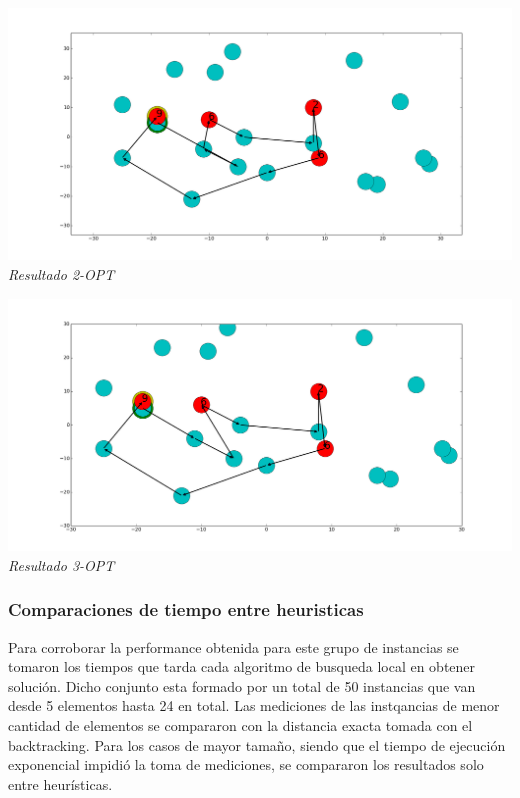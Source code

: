   \vspace*{0.3cm} \vspace*{0.3cm}
  \begin{center}
\includegraphics[scale=0.3]{./EJ5/caminoEj2opt.png}
\\{\textit{Resultado 2-OPT}}
  \end{center}
  \vspace*{0.3cm}
  
    \vspace*{0.3cm} \vspace*{0.3cm}
  \begin{center}
\includegraphics[scale=0.3]{./EJ5/caminoEj3opt.png}
\\{\textit{Resultado 3-OPT}}
  \end{center}
  \vspace*{0.3cm}

\subsubsection{Comparaciones de tiempo entre heuristicas}

Para corroborar la performance obtenida para este grupo de instancias se tomaron los tiempos que tarda cada algoritmo de busqueda local en obtener soluci\'on. 
Dicho conjunto esta formado por un total de 50 instancias que van desde 5 elementos hasta 24 en total. Las mediciones de las instqancias de menor cantidad de elementos se compararon con la distancia exacta tomada con el backtracking. Para los casos de mayor tamaño, siendo que el tiempo de ejecución exponencial impidió la toma de mediciones, se compararon los resultados solo entre heurísticas.


